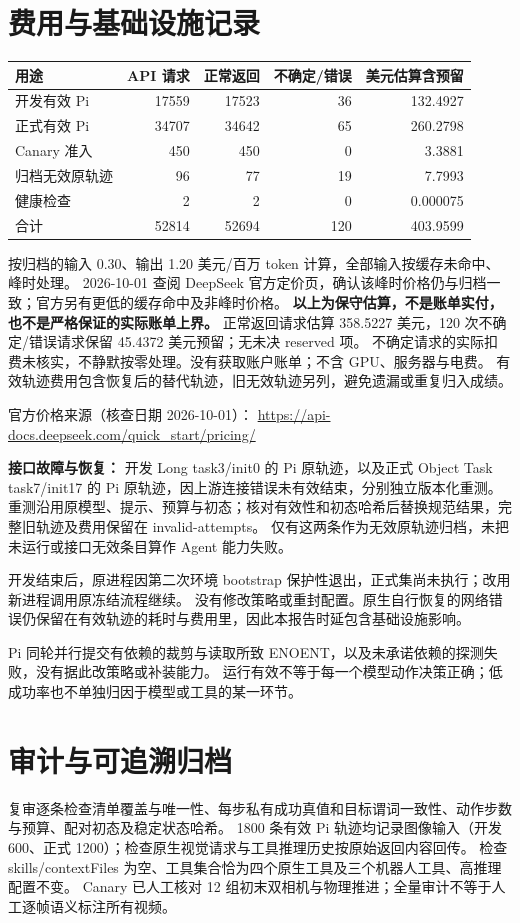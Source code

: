 \documentclass[UTF8,11pt,a4paper]{ctexart}
\begin{document}
\section{费用与基础设施记录}
\begin{center}
\begin{tabular}{lrrrr}
\toprule
用途 & API 请求 & 正常返回 & 不确定/错误 & 美元估算含预留\\
\midrule
开发有效 Pi & 17559 & 17523 & 36 & 132.4927\\
正式有效 Pi & 34707 & 34642 & 65 & 260.2798\\
Canary 准入 & 450 & 450 & 0 & 3.3881\\
归档无效原轨迹 & 96 & 77 & 19 & 7.7993\\
健康检查 & 2 & 2 & 0 & 0.000075\\
\midrule
合计 & 52814 & 52694 & 120 & 403.9599\\
\bottomrule
\end{tabular}
\end{center}
按归档的输入 0.30、输出 1.20 美元/百万 token 计算，全部输入按缓存未命中、峰时处理。
2026-10-01 查阅 DeepSeek 官方定价页，确认该峰时价格仍与归档一致；官方另有更低的缓存命中及非峰时价格。
\textbf{以上为保守估算，不是账单实付，也不是严格保证的实际账单上界。}
正常返回请求估算 358.5227 美元，120 次不确定/错误请求保留 45.4372 美元预留；无未决 reserved 项。
不确定请求的实际扣费未核实，不静默按零处理。没有获取账户账单；不含 GPU、服务器与电费。
有效轨迹费用包含恢复后的替代轨迹，旧无效轨迹另列，避免遗漏或重复归入成绩。

官方价格来源（核查日期 2026-10-01）：
\url{https://api-docs.deepseek.com/quick_start/pricing/}

\textbf{接口故障与恢复：}
开发 Long task3/init0 的 Pi 原轨迹，以及正式 Object Task task7/init17 的 Pi 原轨迹，因上游连接错误未有效结束，分别独立版本化重测。
重测沿用原模型、提示、预算与初态；核对有效性和初态哈希后替换规范结果，完整旧轨迹及费用保留在 invalid-attempts。
仅有这两条作为无效原轨迹归档，未把未运行或接口无效条目算作 Agent 能力失败。

开发结束后，原进程因第二次环境 bootstrap 保护性退出，正式集尚未执行；改用新进程调用原冻结流程继续。
没有修改策略或重封配置。原生自行恢复的网络错误仍保留在有效轨迹的耗时与费用里，因此本报告时延包含基础设施影响。

Pi 同轮并行提交有依赖的裁剪与读取所致 ENOENT，以及未承诺依赖的探测失败，没有据此改策略或补装能力。
运行有效不等于每一个模型动作决策正确；低成功率也不单独归因于模型或工具的某一环节。
\newpage
\section{审计与可追溯归档}
复审逐条检查清单覆盖与唯一性、每步私有成功真值和目标谓词一致性、动作步数与预算、配对初态及稳定状态哈希。
1800 条有效 Pi 轨迹均记录图像输入（开发 600、正式 1200）；检查原生视觉请求与工具推理历史按原始返回内容回传。
检查 skills/contextFiles 为空、工具集合恰为四个原生工具及三个机器人工具、高推理配置不变。
Canary 已人工核对 12 组初末双相机与物理推进；全量审计不等于人工逐帧语义标注所有视频。
\end{document}

